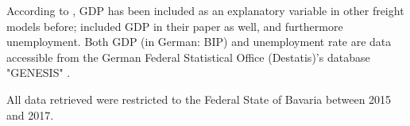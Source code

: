 \documentclass[a4paper, 11pt]{article}
\begin{document}
According to \cite{JONG.2004}, GDP has been included as an explanatory variable in other freight models before; \cite{Intihar} included GDP in their paper as well, and furthermore unemployment. Both GDP (in German: BIP) and unemployment rate are data accessible from the German Federal Statistical Office (Destatis)'s database "GENESIS" \citep{StatistischesBundesamt.2019}.\


All data retrieved were restricted to the Federal State of Bavaria between 2015 and 2017.


\end{document}

